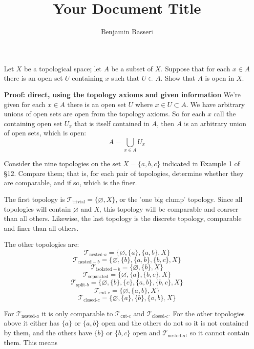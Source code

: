 \documentclass{article}
\title{Your Document Title}
\author{Benjamin Basseri}
\begin{document}
\maketitle


\begin{problem}
Let $X$ be a topological space; let $A$ be a subset of $X$. Suppose that for each $x \in A $ there is an open set $U$ containing $x$ such that $U \subset A$. Show that $A$ is open in $X$.
\end{problem}

\textbf{Proof: direct, using the topology axioms and given information}
We're given for each $x \in A$ there is an open set $U$ where $x \in U \subset A$. We have arbitrary unions of open sets are open from the topology axioms. So for each $x$ call the containing open set $U_x$ that is itself contained in $A$, then $A$ is an arbitrary union of open sets, which is open:
$$A = \bigcup_{x \in A} U_x$$

\begin{problem}
Consider the nine topologies on the set $X = \{a, b, c\}$ indicated in Example 1 of \S 12. Compare them; that is, for each pair of topologies, determine whether they are comparable, and if so, which is the finer.
\end{problem}

The first topology is $\mathscr{T}_{\text{trivial}}=\{\varnothing, X\}$, or the 'one big clump' topology. Since all topologies will contain $\varnothing$ and $X$, this topology will be comparable and coarser than all others. Likewise, the last topology is the discrete topology, comparable and finer than all others.

The other topologies are:
$$\mathscr{T}_{\text{nested-}a}=\{\varnothing, \{a\}, \{a, b\}, X\}$$
$$\mathscr{T}_{\text{nested}-b}=\{\varnothing, \{b\}, \{a, b\}, \{b, c\}, X\}$$
$$\mathscr{T}_{\text{isolated}-b}=\{\varnothing, \{b\}, X\}$$
$$\mathscr{T}_{\text{separated}}=\{\varnothing, \{a\}, \{b, c\}, X\}$$
$$\mathscr{T}_{\text{split-}b} = \{\varnothing, \{b\}, \{c\}, \{a, b\}, \{b, c\}, X\}$$
$$\mathscr{T}_{\text{cut-}c} = \{\varnothing, \{a, b\}, X\}$$
$$\mathscr{T}_{\text{closed-}c} = \{\varnothing, \{a\}, \{b\}, \{a, b\}, X\}$$

For $\mathscr{T}_{\text{nested-}a}$ it is only comparable to $\mathscr{T}_{\text{cut-}c}$ and $\mathscr{T}_{\text{closed-}c}$. For the other topologies above it either has $\{a\}$ or $\{a, b\}$ open and the others do not so it is not contained by them, and the others have $\{b\}$ or $\{b, c\}$ open and $\mathscr{T}_{\text{nested-}a}$, so it cannot contain them. This means
\end{document}
